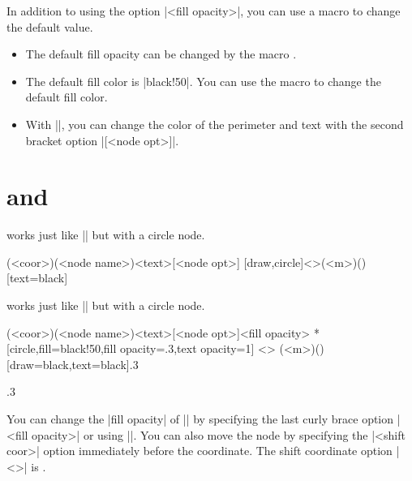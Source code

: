 \remark
In addition to using the option |{<fill opacity>}|, you can use a macro to change the default value.
\begin{itemize}
\item The default fill opacity can be changed by the macro \icmd{\settzfillopacity}.
\item
The default fill color is |black!50|. You can use the macro \icmd{\settzfillcolor} to change the default fill color.
\item With |\tznodeframe|, you can change the color of the perimeter and text with the second bracket option |[<node opt>]|.
\end{itemize}


\section{\protect\cmd{\tznodecircle} and \protect\cmd{\tznodecircle*}}
\label{s:tznodecircle}

\icmd{\tznodecircle} works just like |\tznodeframe| but with a circle node.

\begin{tzdef}{}
(<coor>)(<node name>){<text>}[<node opt>]
  [draw,circle]<>(<m>)(){}[text=black]
\end{tzdef}

\icmd{\tznodecircle*} works just like |\tznodeframe*| but with a circle node.

\begin{tzdef}{}
              (<coor>)(<node name>){<text>}[<node opt>]{<fill opacity>}
 *[circle,fill=black!50,fill opacity=.3,text opacity=1] <>
  (<m>)(){}[draw=black,text=black]{.3}
\end{tzdef}

\begin{tzcode}{.3}
{}
\end{tzcode}

You can change the |fill opacity| of |\tznodecircle*| by specifying the last curly brace option |{<fill opacity>}| or using |\settzfillopacity|. You can also move the node by specifying the |<shift coor>| option immediately before the coordinate.
The  shift coordinate option |<>| is .

